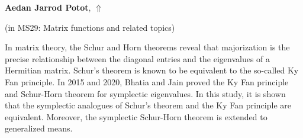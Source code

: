 \documentclass[ILAS2025-program.tex]{subfiles}
\begin{document}
\hypertarget{down0048}{}\begin{ilasabstract}
    
\textbf{Aedan Jarrod Potot},  \hfill \hyperlink{up0048}{$\Uparrow$}
    
    
(in {\color{mstitle}MS29: Matrix functions and related topics})
        
\mtskip
    In matrix theory, the Schur and Horn theorems reveal that majorization
is the precise relationship between the diagonal entries and the eigenvalues
of a Hermitian matrix. Schur’s theorem is known to be equivalent to the
so-called Ky Fan principle. In 2015 and 2020, Bhatia and Jain proved the
Ky Fan principle and Schur-Horn theorem for symplectic eigenvalues. In
this study, it is shown that the symplectic analogues of Schur’s theorem and
the Ky Fan principle are equivalent. Moreover, the symplectic Schur-Horn
theorem is extended to generalized means.

\end{ilasabstract}
    
\end{document}
